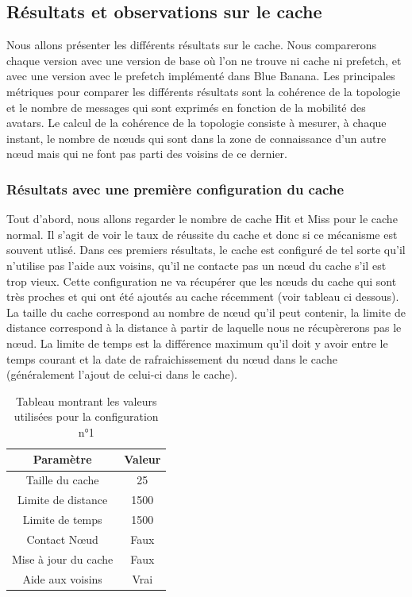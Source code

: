 \subsection{Résultats et observations sur le cache}
\label{resObsCache}

Nous allons présenter les différents résultats sur le cache. Nous comparerons chaque version avec une version de base où l'on ne trouve ni cache ni prefetch, et avec une version avec le prefetch implémenté dans Blue Banana.
Les principales métriques pour comparer les différents résultats sont la cohérence de la topologie et le nombre de messages qui sont exprimés en fonction de la mobilité des avatars. Le calcul de la cohérence de la topologie consiste à mesurer, à chaque instant, le nombre de nœuds qui sont dans la zone de connaissance d'un autre nœud mais qui ne font pas parti des voisins de ce dernier.

\subsubsection{Résultats avec une première configuration du cache}
\par Tout d'abord, nous allons regarder le nombre de cache Hit et Miss pour le cache normal. Il s'agit de voir le taux de réussite du cache et donc si ce mécanisme est souvent utlisé. Dans ces premiers résultats, le cache est configuré de tel sorte qu'il n'utilise pas l'aide aux voisins, qu'il ne contacte pas un nœud du cache s'il est trop vieux. Cette configuration ne va récupérer que les nœuds du cache qui sont très proches et qui ont été ajoutés au cache récemment (voir tableau ci dessous). La taille du cache correspond au nombre de nœud qu'il peut contenir, la limite de distance correspond à la distance à partir de laquelle nous ne récupèrerons pas le nœud. La limite de temps est la différence maximum qu'il doit y avoir entre le temps courant et la date de rafraichissement du nœud dans le cache (généralement l'ajout de celui-ci dans le cache). 
\begin{table}[!h]
  \begin{center}
    \begin{tabular}{|c|c|}
      \hline
      Paramètre & Valeur\\
      \hline
      Taille du cache & 25\\
      Limite de distance &  1500\\
      Limite de temps & 1500\\
      Contact Nœud & Faux\\
      Mise à jour du cache & Faux\\
      Aide aux voisins & Vrai\\
      \hline
    \end{tabular}
  \end{center}
  \label{tab:config1}
  \caption{Tableau montrant les valeurs utilisées pour la configuration n°1}
\end{table}



